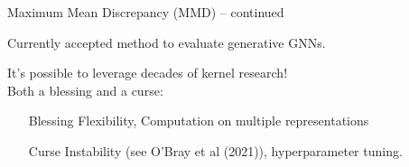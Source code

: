 \documentclass[aspectratio=169, 10pt, dvipsnames]{beamer}
\begin{document}
\begin{frame}[fragile]{Maximum Mean Discrepancy (MMD) -- continued}
  \begin{minipage}{0.68\textwidth}
  \pause\small Currently accepted method to evaluate generative GNNs.
  \pause\begin{figure}
    \centering
  \end{figure}
    \pause\small It's possible to leverage decades of kernel research!\\
    \pause Both a
    \textcolor{PineGreen}{blessing} and a \textcolor{YellowOrange}{curse}:
    \begin{itemize}
      \pause\item[\textcolor{PineGreen}{Blessing}] Flexibility, Computation on
      multiple representations
      \pause\item[\textcolor{YellowOrange}{Curse}] Instability (see O'Bray et
      al (2021)), hyperparameter tuning.
    \end{itemize}


\end{minipage}
\end{frame}
\end{document}
